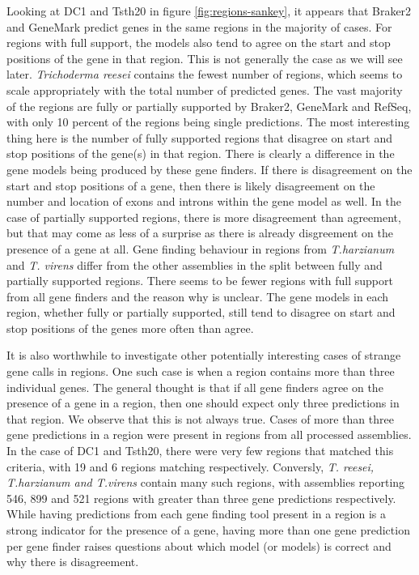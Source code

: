 Looking at DC1 and Tsth20 in figure \ref{fig:regions-sankey}, it
appears that Braker2 and GeneMark predict genes in the same regions in
the majority of cases. For regions with full support, the models also
tend to agree on the start and stop positions of the gene in that
region. This is not generally the case as we will see
later. \textit{Trichoderma reesei} contains the fewest number of
regions, which seems to scale appropriately with the total number of
predicted genes. The vast majority of the regions are fully or
partially supported by Braker2, GeneMark and RefSeq, with only 10
percent of the regions being single predictions. The most interesting
thing here is the number of fully supported regions that disagree on
start and stop positions of the gene(s) in that region. There is
clearly a difference in the gene models being produced by these gene
finders. If there is disagreement on the start and stop positions of a
gene, then there is likely disagreement on the number and location of
exons and introns within the gene model as well. In the case of
partially supported regions, there is more disagreement than
agreement, but that may come as less of a surprise as there is already
disgreement on the presence of a gene at all. Gene finding behaviour
in regions from \textit{T.harzianum} and \textit{T. virens} differ
from the other assemblies in the split between fully and partially
supported regions. There seems to be fewer regions with full support
from all gene finders and the reason why is unclear. The gene models
in each region, whether fully or partially supported, still tend to
disagree on start and stop positions of the genes more often than
agree.

It is also worthwhile to investigate other potentially interesting
cases of strange gene calls in regions. One such case is when a region
contains more than three individual genes. The general thought is that
if all gene finders agree on the presence of a gene in a region, then
one should expect only three predictions in that region. We observe
that this is not always true. Cases of more than three gene
predictions in a region were present in regions from all processed
assemblies. In the case of DC1 and Tsth20, there were very few regions
that matched this criteria, with 19 and 6 regions matching
respectively. Conversly, \textit{T. reesei, T.harzianum and T.virens}
contain many such regions, with assemblies reporting 546, 899 and 521
regions with greater than three gene predictions respectively. While
having predictions from each gene finding tool present in a region is
a strong indicator for the presence of a gene, having more than one
gene prediction per gene finder raises questions about which model (or
models) is correct and why there is disagreement.

